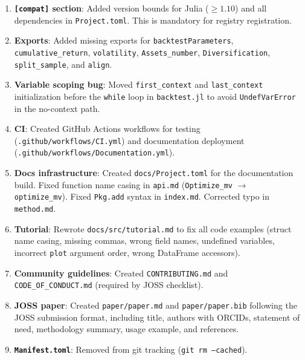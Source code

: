 \documentclass[11pt,a4paper]{article}
\begin{document}
\begin{enumerate}
  \item \textbf{\texttt{[compat]} section}: Added version bounds for Julia
    ($\ge 1.10$) and all dependencies in \texttt{Project.toml}. This is
    mandatory for registry registration.

  \item \textbf{Exports}: Added missing exports for \texttt{backtestParameters},
    \texttt{cumulative\_return}, \texttt{volatility}, \texttt{Assets\_number},
    \texttt{Diversification}, \texttt{split\_sample}, and \texttt{align}.

  \item \textbf{Variable scoping bug}: Moved \texttt{first\_context} and
    \texttt{last\_context} initialization before the \texttt{while} loop in
    \texttt{backtest.jl} to avoid \texttt{UndefVarError} in the no-context path.

  \item \textbf{CI}: Created GitHub Actions workflows for testing
    (\texttt{.github/workflows/CI.yml}) and documentation deployment
    (\texttt{.github/workflows/Documentation.yml}).

  \item \textbf{Docs infrastructure}: Created \texttt{docs/Project.toml} for
    the documentation build. Fixed function name casing in \texttt{api.md}
    (\texttt{Optimize\_mv} $\to$ \texttt{optimize\_mv}). Fixed \texttt{Pkg.add}
    syntax in \texttt{index.md}. Corrected typo in \texttt{method.md}.

  \item \textbf{Tutorial}: Rewrote \texttt{docs/src/tutorial.md} to fix all
    code examples (struct name casing, missing commas, wrong field names,
    undefined variables, incorrect \texttt{plot} argument order, wrong
    DataFrame accessors).

  \item \textbf{Community guidelines}: Created \texttt{CONTRIBUTING.md} and
    \texttt{CODE\_OF\_CONDUCT.md} (required by JOSS checklist).

  \item \textbf{JOSS paper}: Created \texttt{paper/paper.md} and
    \texttt{paper/paper.bib} following the JOSS submission format, including
    title, authors with ORCIDs, statement of need, methodology summary, usage
    example, and references.

  \item \textbf{\texttt{Manifest.toml}}: Removed from git tracking
    (\texttt{git rm --cached}).
\end{enumerate}
\end{document}
